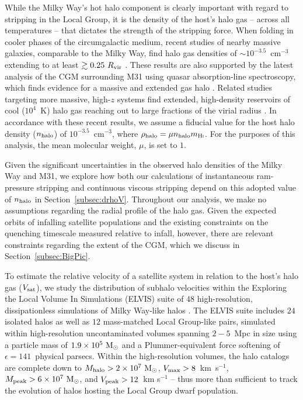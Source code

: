 While the Milky Way's hot halo component is clearly important with
regard to stripping in the Local Group, it is the density
of the host's halo gas -- across all temperatures -- that dictates the
strength of the stripping force.
%
When folding in cooler phases of the circumgalactic medium, recent
studies of nearby massive galaxies, comparable to the Milky Way, find
halo gas densities of $\sim10^{-3.5}$~cm$^{-3}$ extending to
at least $\gtrsim0.25~R_{\rm vir}$ \citep{tumlinson13, werk14, fsm16}.
%
These results are also supported by the latest analysis of the CGM
surrounding M31 using quasar absorption-line spectroscopy, which finds
evidence for a massive and extended gas halo \citep{lehner15}.
%
Related studies targeting more massive, high-$z$ systems find
extended, high-density reservoirs of cool ($10^{4}$~K) halo gas
reaching out to large fractions of the virial radius \citep{lau15}.
%
In accordance with these recent results, we assume a fiducial value
for the host halo density ($n_{\rm halo}$) of $10^{-3.5}$~cm$^{-3}$,
where $\rho_{\rm halo} =\mu n_{\rm halo} m_{\rm H\scalebox{0.45}{\rm
    I}}$. For the purposes of this analysis, the mean molecular
weight, $\mu $, is set to $1$.


Given the significant uncertainties in the observed halo densities of
the Milky Way and M31, we explore how both our calculations of
instantaneous ram-pressure stripping and continuous viscous stripping
depend on this adopted value of
$n_{\rm halo}$ in Section~\ref{subsec:drhoV}.
%
Throughout our analysis, we make no assumptions regarding the radial
profile of the halo gas. 
%
Given the expected orbits of infalling satellite populations and the
existing constraints on the quenching timescale measured relative to
infall, however, there are relevant constraints regarding the extent
of the CGM, which we discuss in Section~\ref{subsec:BigPic}.
%




To estimate the relative velocity of a satellite system in relation to
the host's halo gas ($V_{\rm sat}$), we study the distribution of
subhalo velocities within the Exploring the Local Volume In
Simulations (ELVIS) suite of $48$ high-resolution, dissipationless
simulations of Milky Way-like halos \citep{gk14}.
%
The ELVIS suite includes $24$ isolated halos as well as $12$
mass-matched Local Group-like pairs, simulated within high-resolution
uncontaminated volumes spanning $2-5$~Mpc in size using a particle
mass of $1.9 \times 10^{5}~{\rm M}_{\odot}$ and a Plummer-equivalent force
softening of $\epsilon = 141$~physical parsecs. Within the
high-resolution volumes, the halo catalogs are complete down to
$M_{\rm halo} > 2 \times 10^{7}~{\rm M}_{\odot}$, $V_{\rm max} > 8$~km~s$^{-1}$,
$M_{\rm peak} > 6 \times 10^{7}~{\rm M}_{\odot}$, and $V_{\rm peak} > 12$~km
s$^{-1}$ -- thus more than sufficient to track the evolution of halos
hosting the Local Group dwarf population.
%

